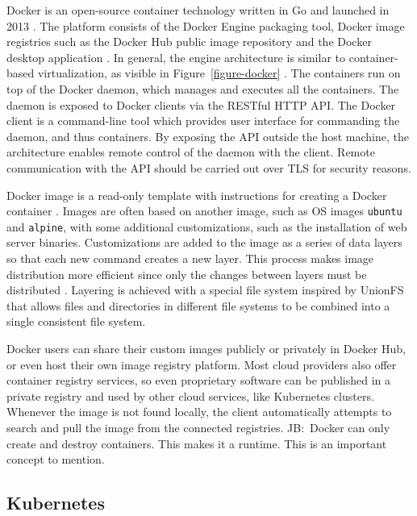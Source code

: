 \documentclass[english, 12pt, a4paper, sci, utf8, a-2b, online]{aaltothesis}
\newcommand{\mycomment}[3]{\textcolor{#1}{#2:~#3}}
\newcommand{\jb}[1]{\noindent\mycomment{aaltoRed}{JB}{#1}}
\begin{document}
Docker is an open-source container technology written in Go and launched in 2013 \cite[text]{docker-what}. The platform consists of the Docker Engine packaging tool, Docker image registries such as the Docker Hub public image repository and the Docker desktop application \cite{docker-overview}. In general, the engine architecture is similar to container-based virtualization, as visible in Figure~\ref{figure-docker} \cite{bui2015analysis}. The containers run on top of the Docker daemon, which manages and executes all the containers. The daemon is exposed to Docker clients via the RESTful HTTP API. The Docker client is a command-line tool which provides user interface for commanding the daemon, and thus containers. By exposing the API outside the host machine, the architecture enables remote control of the daemon with the client. Remote communication with the API should be carried out over TLS for security reasons.

Docker image is a read-only template with instructions for creating a Docker container \cite{docker-overview}. Images are often based on another image, such as OS images \texttt{ubuntu} and \texttt{alpine}, with some additional customizations, such as the installation of web server binaries. Customizations are added to the image as a series of data layers so that each new command creates a new layer. This process makes image distribution more efficient since only the changes between layers must be distributed \cite{bui2015analysis}. Layering is achieved with a special file system inspired by UnionFS that allows files and directories in different file systems to be combined into a single consistent file system.

Docker users can share their custom images publicly or privately in Docker Hub, or even host their own image registry platform. Most cloud providers also offer container registry services, so even proprietary software can be published in a private registry and used by other cloud services, like Kubernetes clusters. Whenever the image is not found locally, the client automatically attempts to search and pull the image from the connected registries.
\jb{Docker can only create and destroy containers. This makes it a runtime. This is an important concept to mention.}

\subsection{Kubernetes}
\end{document}
